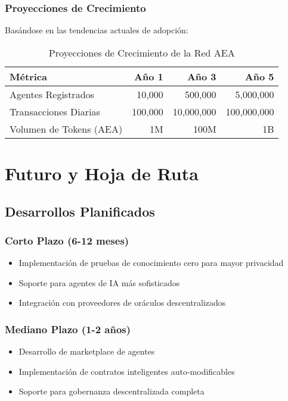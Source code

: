 \documentclass[12pt,a4paper]{article}
\begin{document}
\subsubsection{Proyecciones de Crecimiento}

Basándose en las tendencias actuales de adopción:

\begin{table}[H]
\centering
\begin{tabular}{lrrr}
\toprule
\textbf{Métrica} & \textbf{Año 1} & \textbf{Año 3} & \textbf{Año 5} \\
\midrule
Agentes Registrados & 10,000 & 500,000 & 5,000,000 \\
Transacciones Diarias & 100,000 & 10,000,000 & 100,000,000 \\
Volumen de Tokens (AEA) & 1M & 100M & 1B \\
\bottomrule
\end{tabular}
\caption{Proyecciones de Crecimiento de la Red AEA}
\end{table}

\section{Futuro y Hoja de Ruta}

\subsection{Desarrollos Planificados}

\subsubsection{Corto Plazo (6-12 meses)}
\begin{itemize}
\item Implementación de pruebas de conocimiento cero para mayor privacidad
\item Soporte para agentes de IA más sofisticados
\item Integración con proveedores de oráculos descentralizados
\end{itemize}

\subsubsection{Mediano Plazo (1-2 años)}
\begin{itemize}
\item Desarrollo de marketplace de agentes
\item Implementación de contratos inteligentes auto-modificables
\item Soporte para gobernanza descentralizada completa
\end{itemize}
\end{document}
